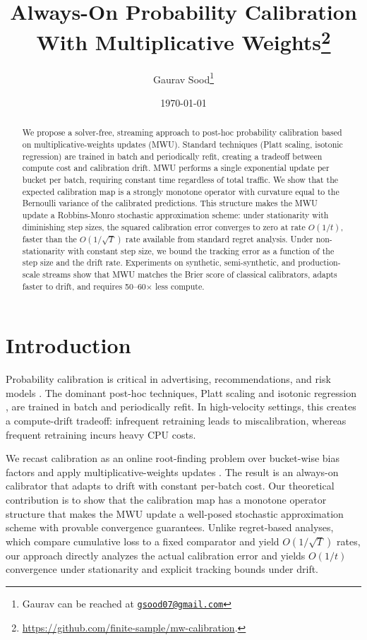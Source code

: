 \documentclass[12pt, letterpaper]{article}
\title{Always-On Probability Calibration With Multiplicative Weights\thanks{\href{https://github.com/finite-sample/mw-calibration}{https://github.com/finite-sample/mw-calibration}.}}
\author{Gaurav Sood\thanks{Gaurav can be reached at \href{mailto:gsood07@gmail.com}{\footnotesize{\texttt{gsood07@gmail.com}}}}\vspace{.5cm}}
\date{\today}
\theoremstyle{definition}
\theoremstyle{remark}
\begin{document}
\maketitle

\begin{abstract}
We propose a solver-free, streaming approach to post-hoc probability calibration based on multiplicative-weights updates (MWU). Standard techniques (Platt scaling, isotonic regression) are trained in batch and periodically refit, creating a tradeoff between compute cost and calibration drift. MWU performs a single exponential update per bucket per batch, requiring constant time regardless of total traffic. We show that the expected calibration map is a strongly monotone operator with curvature equal to the Bernoulli variance of the calibrated predictions. This structure makes the MWU update a Robbins-Monro stochastic approximation scheme: under stationarity with diminishing step sizes, the squared calibration error converges to zero at rate $O(1/t)$, faster than the $O(1/\sqrt{T})$ rate available from standard regret analysis. Under non-stationarity with constant step size, we bound the tracking error as a function of the step size and the drift rate. Experiments on synthetic, semi-synthetic, and production-scale streams show that MWU matches the Brier score of classical calibrators, adapts faster to drift, and requires 50--60$\times$ less compute.
\end{abstract}

\section{Introduction}

Probability calibration is critical in advertising, recommendations, and risk models \citep{Niculescu05, Guo17}. The dominant post-hoc techniques, Platt scaling \citep{Platt99} and isotonic regression \citep{Zadrozny02}, are trained in batch and periodically refit. In high-velocity settings, this creates a compute-drift tradeoff: infrequent retraining leads to miscalibration, whereas frequent retraining incurs heavy CPU costs.

We recast calibration as an online root-finding problem over bucket-wise bias factors and apply multiplicative-weights updates \citep{Arora12}. The result is an always-on calibrator that adapts to drift with constant per-batch cost. Our theoretical contribution is to show that the calibration map has a monotone operator structure that makes the MWU update a well-posed stochastic approximation scheme with provable convergence guarantees. Unlike regret-based analyses, which compare cumulative loss to a fixed comparator and yield $O(1/\sqrt{T})$ rates, our approach directly analyzes the actual calibration error and yields $O(1/t)$ convergence under stationarity and explicit tracking bounds under drift.
\end{document}
